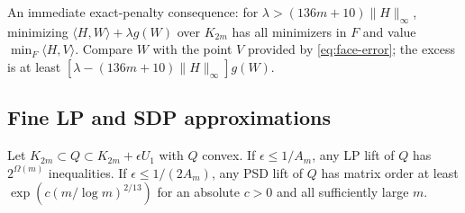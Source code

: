 An immediate exact-penalty consequence: for
$\lambda>(136m+10)\|H\|_\infty$, minimizing
$\langle H,W\rangle+\lambda g(W)$ over $K_{2m}$ has all minimizers in $F$
and value $\min_F\langle H,V\rangle$. Compare $W$ with the point $V$
provided by \eqref{eq:face-error}; the excess is at least
$[\lambda-(136m+10)\|H\|_\infty]g(W)$.

\subsection{Fine LP and SDP approximations}
\begin{proposition}\label{prop:rank-one-approximation}
Let $K_{2m}\subset Q\subset K_{2m}+\epsilon U_1$ with $Q$ convex.
If $\epsilon\le1/A_m$, any LP lift of $Q$ has $2^{\Omega(m)}$
inequalities. If $\epsilon\le1/(2A_m)$, any PSD lift of $Q$ has matrix
order at least $\exp(c(m/\log m)^{2/13})$ for an absolute $c>0$ and all
sufficiently large $m$.
\end{proposition}
